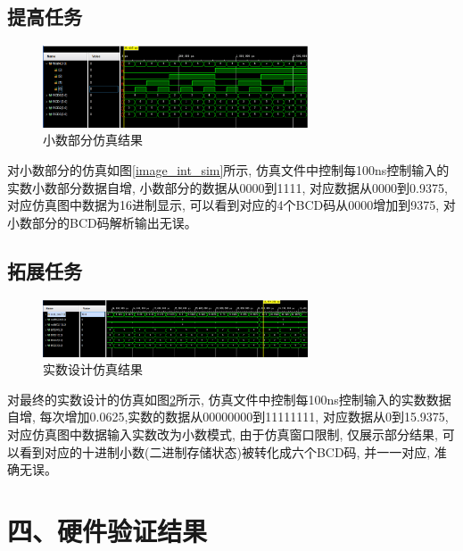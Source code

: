 \documentclass{article}
\newcommand{\fourhao}{\fontsize{14pt}{\baselineskip}\selectfont} %
\newcommand{\xiaosihao}{\fontsize{12pt}{\baselineskip}\selectfont} %
\begin{document}
\subsection*{提高任务}
\begin{figure}[H]
    \centering
    \includegraphics[width=0.7\textwidth]{image/2024-06-16-20-44-36.png}
    \caption{小数部分仿真结果}
    \label{image_float_sim}
\end{figure}
对小数部分的仿真如图\ref{image_int_sim}所示, 仿真文件中控制每100ns控制输入的实数小数部分数据自增, 小数部分的数据从0000到1111, 对应数据从0000到0.9375, 
对应仿真图中数据为16进制显示, 可以看到对应的4个BCD码从0000增加到9375, 对小数部分的BCD码解析输出无误。
\subsection*{拓展任务}
\begin{figure}[htbp]
    \centering
    \includegraphics[width=0.7\textwidth]{image/2024-06-16-22-06-07.png}
    \caption{实数设计仿真结果}
    \label{image_real_sim}
\end{figure}
对最终的实数设计的仿真如图\ref{image_real_sim}所示, 仿真文件中控制每100ns控制输入的实数数据自增, 每次增加0.0625,实数的数据从00000000到11111111, 对应数据从0到15.9375, 
对应仿真图中数据输入实数改为小数模式, 由于仿真窗口限制, 仅展示部分结果, 可以看到对应的十进制小数(二进制存储状态)被转化成六个BCD码, 并一一对应, 准确无误。
\section*{\fourhao 四、硬件验证结果}
\xiaosihao
{}
\end{document}
